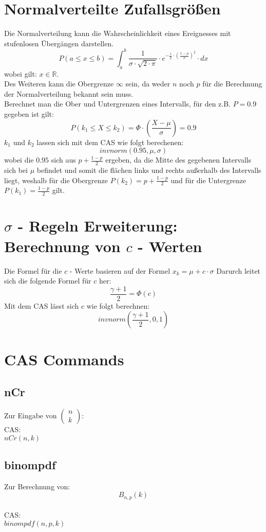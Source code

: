 \documentclass[a4paper,12pt]{article}
\begin{document}
\section{Normalverteilte Zufallsgrößen}
Die Normalverteilung kann die Wahrscheinlichkeit eines Ereignesses mit stufenlosen Übergängen darstellen.
$$P(a \leq x \leq b) = \int_a^b \frac{1}{\sigma \cdot \sqrt{2 \cdot \pi}} \cdot e^{- \frac{1}{2} \cdot (\frac{x - \mu}{\sigma})^2} \cdot dx$$
wobei gilt: $x \in \mathbb{R}$.\\
Des Weiteren kann die Obergrenze $\infty$ sein, da weder $n$ noch $p$ für die Berechnung der Normalverteilung bekannt sein muss.\\
Berechnet man die Ober und Untergrenzen eines Intervalls, für den z.B. $P = 0.9$ gegeben ist gilt:
$$P(k_1 \leq X \leq k_2) = \Phi \cdot (\frac{X - \mu}{\sigma}) = 0.9$$
$k_1$ und $k_2$ lassen sich mit dem CAS wie folgt berechenen:
$$invnorm(0.95, \mu, \sigma)$$
wobei die $0.95$ sich aus $p + \frac{1 - p}{2}$ ergeben, da die Mitte des gegebenen Intervalls sich bei $\mu$ befindet und 
somit die flächen links und rechts außerhalb des Intervalls liegt, weshalb für die Obergrenze $P(k_2) = p + \frac{1 - p}{2}$ und für die 
Untergrenze $P(k_1) = \frac{1 - p}{2}$ gilt.
\section{$\sigma$ - Regeln Erweiterung: Berechnung von $c$ - Werten}
Die Formel für die $c$ - Werte basieren auf der Formel $x_k = \mu + c \cdot \sigma$
Darurch leitet sich die folgende Formel für $c$ her:
$$\frac{\gamma + 1}{2} = \Phi(c)$$
Mit dem CAS lässt sich $c$ wie folgt berechnen:
$$invnorm(\frac{\gamma + 1}{2}, 0, 1)$$
\pagebreak
\section{CAS Commands}
\subsection{nCr}
Zur Eingabe von $\begin{pmatrix}n\\k\end{pmatrix}$:\\
CAS:\\
$nCr(n,k)$\\
\subsection{binompdf}
Zur Berechnung von:\\
$$B_{n,p}(k)$$\\
CAS:\\
$binompdf(n,p,k)$\\
\end{document}
